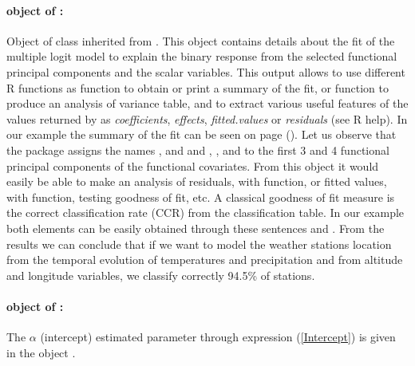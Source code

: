 \paragraph{ object of :} Object of class inherited from . This object contains details about the fit of the multiple logit model to explain the binary response from the selected functional principal components and the scalar variables. This output allows to use different R functions as  function to obtain or print a summary of the fit, or  function to produce an analysis of variance table, and to extract various useful features of the values returned by  as {\it coefficients}, {\it effects}, {\it fitted.values} or {\it residuals} (see R help). In our example the summary of the fit can be seen on page (\pageref{glmsummary}). Let us observe that the package assigns the names ,  and  and , ,  and  to the first 3 and 4 functional principal components of the functional covariates. From this object it would easily be able to make an analysis of residuals, with  function, or fitted values, with  function, testing goodness of fit, etc. A classical goodness of fit measure is the correct classification rate (CCR) from the classification table. In our example both elements can be easily obtained through these sentences  and . From the results we can conclude that if we want to model the weather stations location from the temporal evolution of temperatures and precipitation and from altitude and longitude variables, we classify correctly 94.5\% of stations.

\paragraph{  object of :} The $\alpha$ (intercept) estimated parameter through expression (\ref{Intercept}) is given in the object .

